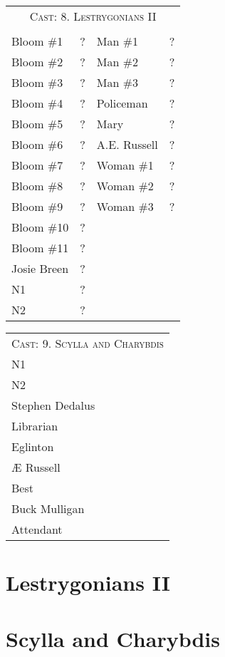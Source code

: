 \begin{tabular}{l p{5cm} l p{5cm}}
    \multicolumn{4}{c}{\Large \textsc{Cast: 8. Lestrygonians II}} \\
\\
Bloom \#1           & ?                     & Man \#1               & ? \\
Bloom \#2           & ?                     & Man \#2               & ? \\
Bloom \#3           & ?                     & Man \#3               & ? \\
Bloom \#4           & ?                     & Policeman             & ? \\
Bloom \#5           & ?                     & Mary                  & ? \\
Bloom \#6           & ?                     & A.E. Russell          & ? \\
Bloom \#7           & ?                     & Woman \#1             & ? \\
Bloom \#8           & ?                     & Woman \#2             & ? \\
Bloom \#9           & ?                     & Woman \#3             & ? \\
Bloom \#10          & ?                \\
Bloom \#11          & ?                \\
Josie Breen         & ?                \\
N1                  & ?                \\
N2                  & ?                \\

\end{tabular}

\bigskip
\bigskip

\begin{tabular}{l p{5cm} l p{5cm}}
    \multicolumn{4}{c}{\Large \textsc{Cast: 9. Scylla and Charybdis}} \\
N1 \\  %
N2 \\  %
Stephen Dedalus \\
Librarian \\
Eglinton \\
Æ Russell \\
Best \\
Buck Mulligan \\
Attendant \\

\end{tabular}
\thispagestyle{empty}

\newpage


\setcounter{page}{1}
\setcounter{section}{7}  %

\section{Lestrygonians II}


\pagebreak

\section{Scylla and Charybdis}




